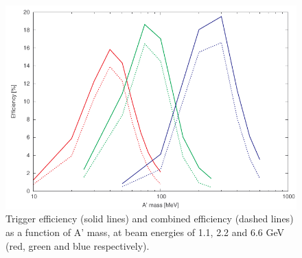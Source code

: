 \begin{figure}[ht]
	\includegraphics[width=\textwidth]{performance/trigger/ap_eff}
	\caption{\small{Trigger efficiency (solid lines) and combined efficiency (dashed lines) as a function of A' mass, at beam energies of 1.1, 2.2 and 6.6 GeV (red, green and blue respectively).}}
	\label{fig:trigeff}
\end{figure}

